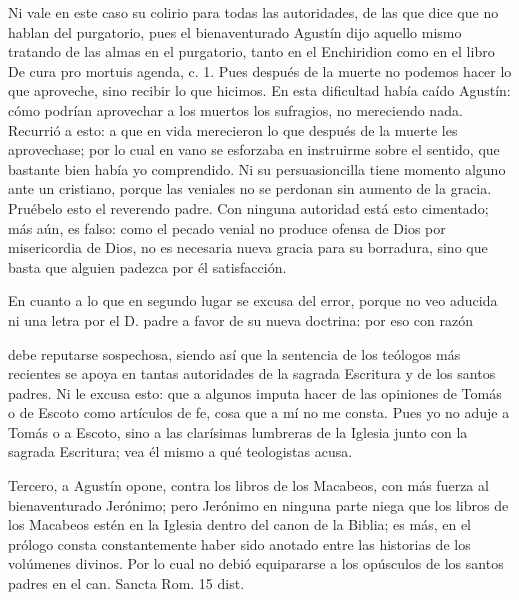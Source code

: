 Ni vale en este caso su colirio para todas las autoridades, de las que dice que no hablan del purgatorio, pues el bienaventurado Agustín dijo aquello mismo tratando de las almas en el purgatorio, tanto en el Enchiridion como en el libro De cura pro mortuis agenda, c. 1. Pues después de la muerte no podemos hacer lo que aproveche, sino recibir lo que hicimos. En esta dificultad había caído Agustín: cómo podrían aprovechar a los muertos los sufragios, no mereciendo nada. Recurrió a esto: a que en vida merecieron lo que después de la muerte les aprovechase; por lo cual en vano se esforzaba en instruirme sobre el sentido, que bastante bien había yo comprendido. Ni su persuasioncilla tiene momento alguno ante un cristiano, porque las veniales no se perdonan sin aumento de la gracia. Pruébelo esto el reverendo padre. Con ninguna autoridad está esto cimentado; más aún, es falso: como el pecado venial no produce ofensa de Dios por misericordia de Dios, no es necesaria nueva gracia para su borradura, sino que basta que alguien padezca por él satisfacción.

En cuanto a lo que en segundo lugar se excusa del error, porque no veo aducida ni una letra por el D. padre a favor de su nueva doctrina: por eso con razón

debe reputarse sospechosa, siendo así que la sentencia de los teólogos más recientes se apoya en tantas autoridades de la sagrada Escritura y de los santos padres. Ni le excusa esto: que a algunos imputa hacer de las opiniones de Tomás o de Escoto como artículos de fe, cosa que a mí no me consta. Pues yo no aduje a Tomás o a Escoto, sino a las clarísimas lumbreras de la Iglesia junto con la sagrada Escritura; vea él mismo a qué teologistas acusa.

Tercero, a Agustín opone, contra los libros de los Macabeos, con más fuerza al bienaventurado Jerónimo; pero Jerónimo en ninguna parte niega que los libros de los Macabeos estén en la Iglesia dentro del canon de la Biblia; es más, en el prólogo consta constantemente haber sido anotado entre las historias de los volúmenes divinos. Por lo cual no debió equipararse a los opúsculos de los santos padres en el can. Sancta Rom. 15 dist.

